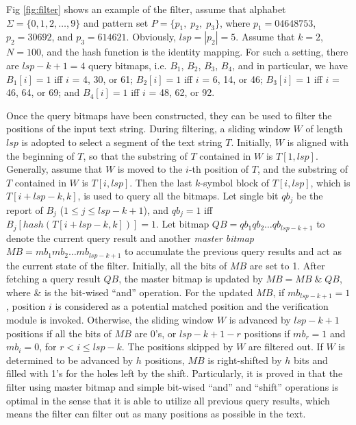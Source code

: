 \documentclass{article}
\begin{document}
Fig \ref{fig:filter} shows an example of the filter, assume that
alphabet $\Sigma = \{0, 1, 2, \dots, 9\}$ and pattern set
$P = \{p_1,\; p_2,\; p_3\}$, where $p_1 = 04648753$, $p_2 = 30692$,
and $p_3 = 614621$.  Obviously, $lsp = |p_2|= 5$. Assume that $k = 2$,
$N = 100$, and the hash function is the identity mapping. For such a
setting, there are $lsp - k + 1 = 4$ query bitmaps, i.e. $B_1$, $B_2$,
$B_3$, $B_4$, and in particular, we have $B_1[i] = 1$ iff $i$ = 4, 30,
or 61; $B_2[i] = 1$ iff $i$ = 6, 14, or 46; $B_3[i] = 1$ iff $i$ = 46,
64, or 69; and $B_4[i] = 1$ iff $i$ = 48, 62, or 92.

Once the query bitmaps have been constructed, they can be used to
filter the positions of the input text string. During filtering, a
sliding window $W$ of length $lsp$ is adopted to select a segment of
the text string $T$. Initially, $W$ is aligned with the beginning of
$T$, so that the substring of $T$ contained in $W$ is $T[1,lsp]$.
Generally, assume that $W$ is moved to the $i$-th position of $T$, and
the substring of $T$ contained in $W$ is $T[i,lsp]$. Then the last
$k$-symbol block of $T[i,lsp]$, which is $T[i+lsp-k, k]$, is used to
query all the bitmaps. Let single bit $qb_j$ be the report of $B_j$
($1 \leq j \leq lsp - k + 1$), and $qb_j=1$ iff
$B_j[hash(T[i+lsp-k,k])] = 1$. Let bitmap
$QB = qb_1qb_2 \dots qb_{lsp-k+1}$ to denote the current query result
and another \emph{master bitmap} $MB = mb_1mb_2 \dots mb_{lsp-k+1}$ to
accumulate the previous query results and act as the current state of
the filter. Initially, all the bits of $MB$ are set to 1. After
fetching a query result $QB$, the master bitmap is updated by
$MB = MB \; \& \; QB$, where \& is the bit-wised ``and''
operation. For the updated $MB$, if $mb_{lsp-k+1} = 1$, position $i$
is considered as a potential matched position and the verification
module is invoked. Otherwise, the sliding window $W$ is advanced by
$lsp-k+1$ positions if all the bits of $MB$ are 0's, or $lsp-k+1-r$
positions if $mb_r=1$ and $mb_i=0$, for $r < i \leq lsp-k$. The
positions skipped by $W$ are filtered out. If $W$ is determined to be
advanced by $h$ positions, $MB$ is right-shifted by $h$ bits and
filled with 1's for the holes left by the shift. Particularly, it is
proved in \cite{Lee2013} that the filter using master bitmap and
simple bit-wised ``and'' and ``shift'' operations is optimal in the
sense that it is able to utilize all previous query results, which
means the filter can filter out as many positions as possible in the
text.

\end{document}
